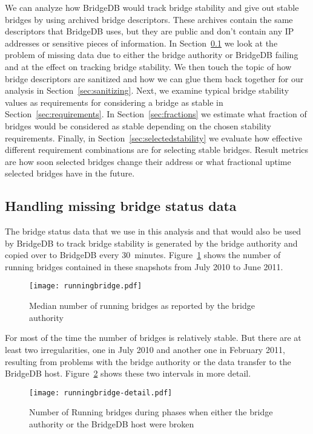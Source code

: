 \documentclass{article}
\begin{document}
We can analyze how BridgeDB would track bridge stability and give out
stable bridges by using archived bridge descriptors.
These archives contain the same descriptors that BridgeDB uses, but they
are public and don't contain any IP addresses or sensitive pieces of
information.
In Section~\ref{sec:missingdata} we look at the problem of missing data
due to either the bridge authority or BridgeDB failing and at the effect
on tracking bridge stability.
We then touch the topic of how bridge descriptors are sanitized and how we
can glue them back together for our analysis in
Section~\ref{sec:sanitizing}.
Next, we examine typical bridge stability values as requirements for
considering a bridge as stable in Section~\ref{sec:requirements}.
In Section~\ref{sec:fractions} we estimate what fraction of bridges would
be considered as stable depending on the chosen stability requirements.
Finally, in Section~\ref{sec:selectedstability} we evaluate how effective
different requirement combinations are for selecting stable bridges.
Result metrics are how soon selected bridges change their address or what
fractional uptime selected bridges have in the future.

\subsection{Handling missing bridge status data}
\label{sec:missingdata}

The bridge status data that we use in this analysis and that would also be
used by BridgeDB to track bridge stability is generated by the bridge
authority and copied over to BridgeDB every 30~minutes.
Figure~\ref{fig:runningbridge} shows the number of running bridges
contained in these snapshots from July 2010 to June 2011.

\begin{figure}[t]
\texttt{[image: runningbridge.pdf]}
\caption{Median number of running bridges as reported by the bridge
authority}
\label{fig:runningbridge}
\end{figure}

For most of the time the number of bridges is relatively stable.
But there are at least two irregularities, one in July 2010 and another
one in February 2011, resulting from problems with the bridge authority or
the data transfer to the BridgeDB host.
Figure~\ref{fig:runningbridge-detail} shows these two intervals in more
detail.

\begin{figure}[t]
\texttt{[image: runningbridge-detail.pdf]}
\caption{Number of Running bridges during phases when either the bridge
authority or the BridgeDB host were broken}
\label{fig:runningbridge-detail}
\end{figure}
\end{document}
